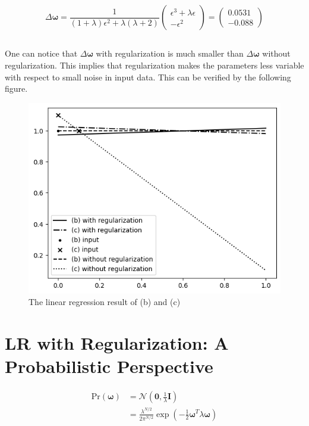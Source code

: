 \documentclass[12pt]{article}
\begin{document}
\begin{equation}
    \Delta \boldsymbol{\omega} = \frac{1}{(1+\lambda)\epsilon^2 + \lambda(\lambda + 2)} \begin{pmatrix}
        \epsilon^3 + \lambda\epsilon \\ -\epsilon^2
    \end{pmatrix} = \begin{pmatrix}
        0.0531 \\ -0.088
    \end{pmatrix}
\end{equation}

\subsection{}
One can notice that $\Delta \boldsymbol{\omega}$ with regularization is much smaller than $\Delta \boldsymbol{\omega}$ without regularization. This implies that regularization makes the parameters less variable with respect to small noise in input data. This can be verified by the following figure.

\begin{figure}[!h]
    \centering
    \includegraphics[scale = 0.7]{./figures/output.png}
    \caption{The linear regression result of (b) and (c)}
\end{figure}

\section{LR with Regularization: A Probabilistic Perspective}
\begin{align*}
    \text{Pr}(\boldsymbol{\omega}) &= \mathcal{N}(\boldsymbol{0},\frac{1}{\lambda} \boldsymbol{I}) \\ &= \frac{\lambda^{N/2}}{2\pi^{N/2}}\exp\left({-\frac{1}{2}\boldsymbol{\omega}^T \lambda \boldsymbol{\omega}}\right)
\end{align*}
\end{document}
